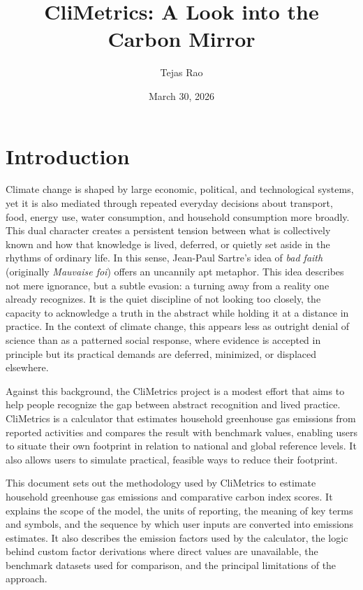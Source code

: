 \documentclass[11pt,a4paper]{article}
\title{CliMetrics: A Look into the Carbon Mirror}
\author{Tejas Rao}
\date{March 30, 2026}
\begin{document}
\maketitle
\linespread{1.1}\selectfont

\section{Introduction}
Climate change is shaped by large economic, political, and technological systems, yet it is also mediated through repeated everyday decisions about transport, food, energy use, water consumption, and household consumption more broadly. This dual character creates a persistent tension between what is collectively known and how that knowledge is lived, deferred, or quietly set aside in the rhythms of ordinary life. In this sense, Jean-Paul Sartre's idea of \textit{bad faith} (originally \textit{Mauvaise foi}) offers an uncannily apt metaphor. This idea describes not mere ignorance, but a subtle evasion: a turning away from a reality one already recognizes. It is the quiet discipline of not looking too closely, the capacity to acknowledge a truth in the abstract while holding it at a distance in practice. In the context of climate change, this appears less as outright denial of science than as a patterned social response, where evidence is accepted in principle but its practical demands are deferred, minimized, or displaced elsewhere.

Against this background, the CliMetrics project is a modest effort that aims to help people recognize the gap between abstract recognition and lived practice. CliMetrics is a calculator that estimates household greenhouse gas emissions from reported activities and compares the result with benchmark values, enabling users to situate their own footprint in relation to national and global reference levels. It also allows users to simulate practical, feasible ways to reduce their footprint.

This document sets out the methodology used by CliMetrics to estimate household greenhouse gas emissions and comparative carbon index scores. It explains the scope of the model, the units of reporting, the meaning of key terms and symbols, and the sequence by which user inputs are converted into emissions estimates. It also describes the emission factors used by the calculator, the logic behind custom factor derivations where direct values are unavailable, the benchmark datasets used for comparison, and the principal limitations of the approach.
\end{document}
